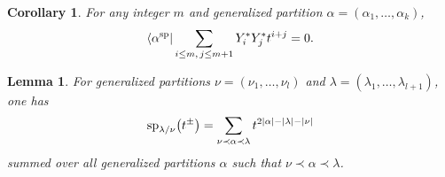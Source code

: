 \documentclass[pdftex]{sigma}
\numberwithin{equation}{section}
\newtheorem{Corollary}[Theorem]{Corollary}
\newtheorem{Lemma}[Theorem]{Lemma}
\begin{document}
\begin{Corollary}\label{cor1}
For any integer $m$ and generalized partition $\alpha=(\alpha_1,\dots,\alpha_k)$,
\begin{align*}
\langle\alpha^{\rm sp}|\sum_{i\leq m,\, j\leq m+1}Y^*_{i}Y^*_{j}t^{i+j}=0.
\end{align*}
\end{Corollary}
\begin{Lemma}\label{le4}
For generalized partitions $\nu=(\nu_{1},\dots,\nu_{l})$ and $\lambda=(\lambda_{1},\dots,\lambda_{l+1})$, one has
\begin{align*}
{\rm sp}_{\lambda/\nu}\big(t^{\pm}\big)=\sum_{\nu\prec\alpha\prec\lambda}t^{2|\alpha|-|\lambda|-|\nu|}
\end{align*}
summed over all generalized partitions $\alpha$ such that $\nu\prec\alpha\prec\lambda$.
\end{Lemma}
\end{document}
